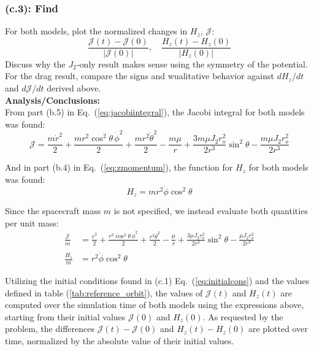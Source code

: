 \documentclass[titlepage]{article}
\begin{document}
\subsubsection*{(c.3): Find}

For both models, plot the normalized changes in $H_z$, $\mathcal{J}$:
\begin{equation}
	\frac{\mathcal{J}(t)-\mathcal{J}(0)}{|\mathcal{J}(0)|},\quad\frac{H_z(t)-H_z(0)}{|H_z(0)|}
	\label{eq:normalizedchange}
\end{equation}
Discuss why the $J_2$-only result makes sense using the symmetry of the potential. For the drag result, compare the signs and wualitative behavior against $dH_z/dt$ and $d\mathcal{J}/dt$ derived above.\\

\textbf{Analysis/Conclusions:}\\

From part (b.5) in Eq.~(\ref{eq:jacobiintegral}), the Jacobi integral for both models was found:
\begin{equation}
	\mathcal{J}=\frac{m\dot{r}^2}{2}+\frac{mr^2\cos^2\theta\,\dot{\phi}^2}{2}+\frac{mr^2\dot{\theta}^2}{2}-\frac{m\mu}{r}+\frac{3m\mu J_2r_o^2}{2r^3}\sin^2\theta-\frac{m\mu J_2r_o^2}{2r^3}
\end{equation}

And in part (b.4) in Eq.~(\ref{eq:zmomentum}), the function for $H_z$ for both models was found:
\begin{equation}
	H_z=mr^2\dot{\phi}\cos^2\theta
\end{equation}

Since the spacecraft mass $m$ is not specified, we instead evaluate both quantities per unit mass:
\begin{equation}
	\begin{split}
		\frac{\mathcal{J}}{m}&=\frac{\dot{r}^2}{2}+\frac{r^2\cos^2\theta\,\dot{\phi}^2}{2}+\frac{r^2\dot{\theta}^2}{2}-\frac{\mu}{r}+\frac{3\mu J_2r_o^2}{2r^3}\sin^2\theta-\frac{\mu J_2r_o^2}{2r^3} \\
		\\
		\frac{H_z}{m}&=r^2\dot{\phi}\cos^2\theta
	\end{split}
	\label{eq:massnorm}
\end{equation}

Utilizing the initial conditions found in (c.1) Eq.~(\ref{eq:initialcons}) and the values defined in table (\ref{tab:reference_orbit}), the values of $\mathcal{J}(t)$ and $H_z(t)$ are computed over the simulation time of both models using the expressions above, starting from their initial values $\mathcal{J}(0)$ and $H_z(0)$. As requested by the problem, the differences $\mathcal{J}(t)-\mathcal{J}(0)$ and $H_z(t)-H_z(0)$ are plotted over time, normalized by the absolute value of their initial values.
\end{document}
